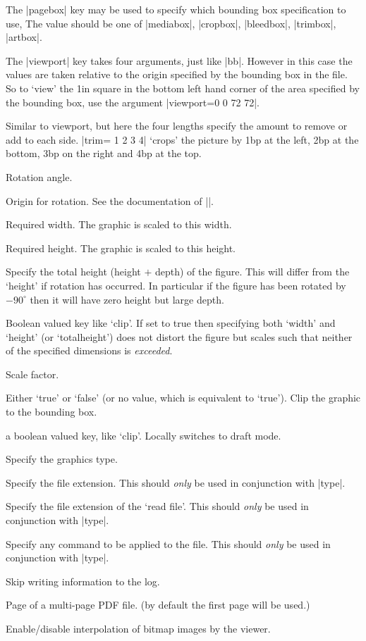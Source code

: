 \begin{description}
The |pagebox| key may be used to specify which bounding box specification to use,
The value should be one of
|mediabox|, |cropbox|, |bleedbox|, |trimbox|, |artbox|.
\item[viewport]
 The |viewport| key takes four arguments, just like
 |bb|. However in this case the values are taken relative to the
 origin specified by the bounding box in the file. So to `view' the
 1in square in the bottom left hand corner of the area specified by
 the bounding box, use the argument |viewport=0 0 72 72|.
\item[trim]
 Similar to viewport, but here the four lengths specify the
 amount to remove or add to each side. |trim= 1 2 3 4| `crops' the
 picture by 1bp at the left, 2bp at the bottom, 3bp on the right and
 4bp at the top.
\item[angle] Rotation angle.
\item[origin]
 Origin for rotation. See the documentation of |\rotatebox|.
\item[width] Required width. The
  graphic is scaled to this width.
\item[height] Required height. The
  graphic is scaled to this height.
\item[totalheight]
 Specify the total height (height $+$ depth) of the figure.
 This will differ from the `height' if rotation has occurred.
 In particular if the figure has been rotated by $-90^\circ$ 
 then it will have zero height but large depth.
\item[keepaspectratio]
 Boolean valued key like `clip'.
 If set to true then specifying both `width' and `height' (or
 `totalheight') does not distort the figure but scales such that
  neither of the specified dimensions is \emph{exceeded}.
\item[scale] Scale factor.
\item[clip] Either `true' or `false' (or no value, which is equivalent
  to `true'). Clip the graphic to the bounding box.
\item[draft] a boolean valued key, like `clip'. Locally switches to
  draft mode.
\item[type] Specify the graphics type.
\item[ext]  Specify the file extension. This should \emph{only} be
 used in conjunction with |type|.
\item[read] Specify the file extension of the `read file'. This
 should \emph{only} be used in conjunction with |type|. 
\item[command] Specify any command to be applied to the file.  This
 should \emph{only} be used in conjunction with |type|.
\item[quiet]
 Skip writing information to the log.
\item[page]
Page of a multi-page PDF file. (by default the first page will be used.)
\item[interpolate]
Enable/disable interpolation of bitmap images by the viewer.
\end{description}

